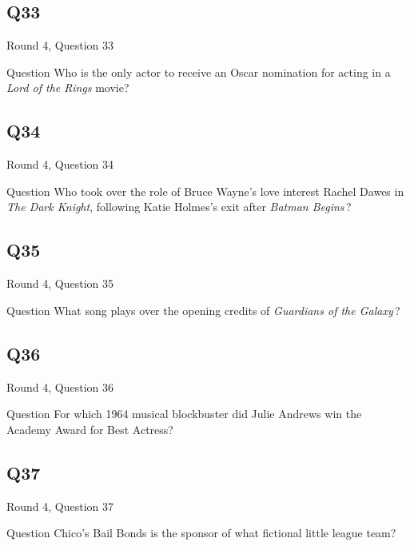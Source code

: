 \documentclass[11pt]{beamer}
\begin{document}
\subsection*{Q33}
\begin{frame}[t]{Round 4, Question 33}
\vspace{2em}
\begin{block}{Question}
Who is the only actor to receive an Oscar nomination for acting in a \emph{Lord of the Rings} movie?
\end{block}
\end{frame}
    

\subsection*{Q34}
\begin{frame}[t]{Round 4, Question 34}
\vspace{2em}
\begin{block}{Question}
Who took over the role of Bruce Wayne's love interest Rachel Dawes in \emph{The Dark Knight}, following Katie Holmes's exit after \emph{Batman Begins}\,?
\end{block}
\end{frame}
    

\subsection*{Q35}
\begin{frame}[t]{Round 4, Question 35}
\vspace{2em}
\begin{block}{Question}
What song plays over the opening credits of \emph{Guardians of the Galaxy}\,?
\end{block}
\end{frame}
    

\subsection*{Q36}
\begin{frame}[t]{Round 4, Question 36}
\vspace{2em}
\begin{block}{Question}
For which 1964 musical blockbuster did Julie Andrews win the Academy Award for Best Actress?
\end{block}
\end{frame}
    

\subsection*{Q37}
\begin{frame}[t]{Round 4, Question 37}
\vspace{2em}
\begin{block}{Question}
Chico's Bail Bonds is the sponsor of what fictional little league team?
\end{block}
\end{frame}
    
\end{document}
